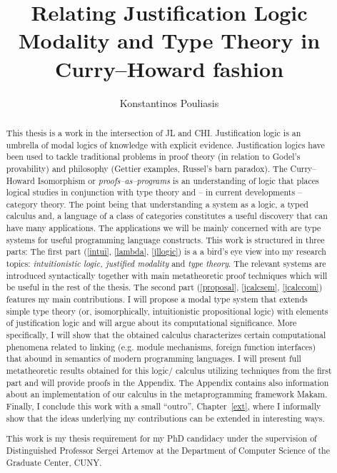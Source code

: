 \documentclass[12pt]{report}
\title{Relating Justification Logic Modality and Type Theory in Curry--Howard fashion}
\author{Konstantinos Pouliasis}
\begin{document}
\maketitle


\begin{abstract}
This thesis is a work in the intersection of \ac{JL} and \ac{CHI}. Justification logic is an umbrella of modal logics of knowledge with explicit evidence. 
Justification logics have been used to tackle traditional problems in proof theory (in relation to Godel's provability) and philosophy (Gettier examples, Russel's barn paradox). 
The Curry--Howard Isomorphism or \emph{proofs--as--programs} is an understanding of logic that places logical studies in conjunction with type theory and -- in current developments -- 
category theory. The point being that  understanding a system as a logic, a typed calculus and,  a language of a class of categories constitutes a useful discovery 
that can have many applications.
The applications  we will be mainly concerned with  are type systems 
for useful programming language constructs. 
This work  is structured in three parts: 
The first part (\cref{intui}, \cref{lambda}, \cref{jllogic}) is a  
a bird's eye view into my 
research topics:  
\emph{intuitionistic logic, justified modality} and \emph{type theory}. 
The relevant systems are introduced syntactically together with main 
 metatheoretic proof techniques which will be useful 
in the rest of the thesis.
The second part (\cref{proposal}, \cref{jcalcsem}, \cref{jcalccom}) 
features my main contributions.
I will propose  
a modal type system that extends simple type theory
 (or, isomorphically, intuitionistic propositional logic) with elements of
 justification logic and will argue about its computational significance. 
 More specifically, I will show  
that the obtained calculus characterizes  certain 
computational phenomena related to linking (e.g. module mechanisms, foreign function interfaces) 
that abound in semantics of modern programming languages. 
I will present full metatheoretic
results obtained for this logic/ calculus utilizing techniques from the first part 
and will provide proofs in the Appendix. The Appendix contains also information about
an implementation of our calculus in the metaprogramming framework {\sf Makam}.
Finally, I conclude this work with a small ``outro'', Chapter~\ref{ext},
where I informally show that the ideas underlying my contributions 
can be extended in interesting ways.

This work is my thesis requirement for my PhD candidacy under the supervision of Distinguished Professor Sergei Artemov at the Department of 
Computer Science of the Graduate Center, CUNY.
\end{abstract}

\tableofcontents








\begin{appendices}

\end{appendices}




\nocite{Pfenning2009a, Pfenning2009b}




\end{document}
